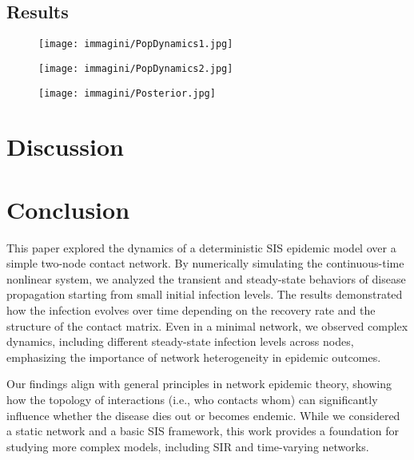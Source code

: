 \documentclass[a4paper,10pt]{report}
\begin{document}
\subsection{Results}

\begin{figure}[h!]
	\centering
	\begin{minipage}{0.45\textwidth}
		\centering
		\texttt{[image: immagini/PopDynamics1.jpg]}
		\label{fig:immagine1}
	\end{minipage}
	\hfill
	\begin{minipage}{0.45\textwidth}
		\centering
		\texttt{[image: immagini/PopDynamics2.jpg]}
		\label{fig:immagine2}
	\end{minipage}
\end{figure}
\begin{figure}[h]
	\centering
	\texttt{[image: immagini/Posterior.jpg]}
\end{figure}


\section{Discussion}


\section{Conclusion}

This paper explored the dynamics of a deterministic SIS epidemic model over a simple two-node contact network. By numerically simulating the continuous-time nonlinear system, we analyzed the transient and steady-state behaviors of disease propagation starting from small initial infection levels. The results demonstrated how the infection evolves over time depending on the recovery rate and the structure of the contact matrix. Even in a minimal network, we observed complex dynamics, including different steady-state infection levels across nodes, emphasizing the importance of network heterogeneity in epidemic outcomes.

Our findings align with general principles in network epidemic theory, showing how the topology of interactions (i.e., who contacts whom) can significantly influence whether the disease dies out or becomes endemic. While we considered a static network and a basic SIS framework, this work provides a foundation for studying more complex models, including SIR and time-varying networks.
\end{document}

